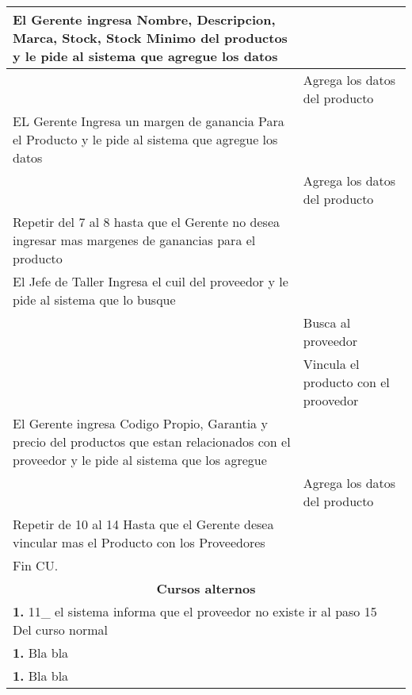 \begin{longtable}{ |p{8cm}|p{8cm}| }
			\inc El Gerente ingresa Nombre, Descripcion,  Marca, Stock, Stock Minimo del productos y le pide al sistema que agregue los datos &   \\
			\hline
			& \inc Agrega los datos del producto \\
			\hline
			\inc EL Gerente Ingresa un margen de ganancia Para el Producto y le pide al sistema que agregue los datos &   \\
			\hline
			& \inc Agrega los datos del producto \\
			\hline
			\inc Repetir del 7 al 8 hasta que el Gerente no desea ingresar mas margenes de ganancias para el producto &  \\
			\hline
			\inc  El Jefe de Taller Ingresa el cuil del proveedor y le pide al sistema que lo busque  &    \\
			\hline
			& \inc Busca al proveedor  \\
			\hline
			& \inc  Vincula el producto con el proovedor  \\
			\hline
			\inc El Gerente ingresa Codigo Propio, Garantia y precio del productos que estan relacionados con el proveedor y le pide al sistema que los agregue  &   \\
			\hline
			& \inc  Agrega los datos del producto   \\
			\hline
			\inc Repetir de 10 al 14 Hasta que el Gerente desea vincular mas el Producto con los Proveedores &  \\
			\hline
			\inc Fin CU. & \\
		\hline
		\multicolumn{2}{|c|}{\textbf{Cursos alternos}}\\
		\hline
		\multicolumn{2}{|p{16cm}|}{\textbf{1. }11_ el sistema informa que el proveedor no existe ir al paso 15 Del curso normal }\\
		\hline
		\multicolumn{2}{|p{16cm}|}{\textbf{1. }Bla bla }\\
		\hline
		\multicolumn{2}{|p{16cm}|}{\textbf{1. }Bla bla }\\
		\hline	
	\end{longtable}

